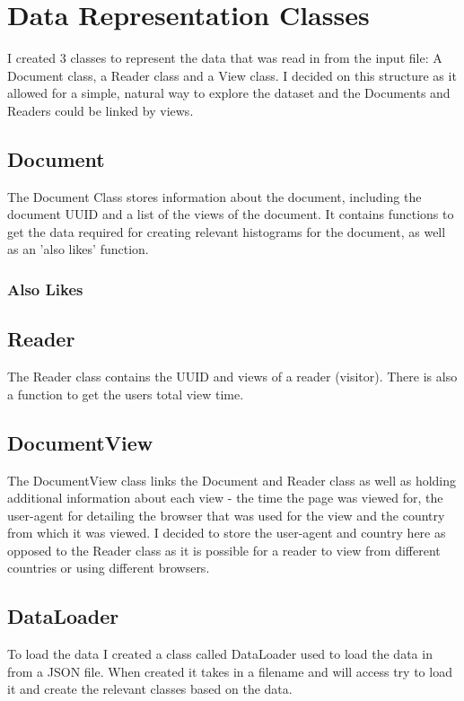 \documentclass[11pt]{report}
\begin{document}
\section{Data Representation Classes}
I created 3 classes to represent the data that was read in from the input file: A Document class, a Reader class and a View class.  I decided on this structure as it allowed for a simple, natural way to explore the dataset and the Documents and Readers could be linked by views.

\subsection{Document}
The Document Class stores information about the document, including the document UUID and a list of the views of the document.  It contains functions to get the data required for creating relevant histograms for the document, as well as an 'also likes' function.

\subsubsection{Also Likes}

\subsection{Reader}
The Reader class contains the UUID and views of a reader (visitor).  There is also a function to get the users total view time.

\subsection{DocumentView}
The DocumentView class links the Document and Reader class as well as holding additional information about each view - the time the page was viewed for, the user-agent for detailing the browser that was used for the view and the country from which it was viewed.  I decided to store the user-agent and country here as opposed to the Reader class as it is possible for a reader to view from different countries or using different browsers.

\subsection{DataLoader}
To load the data I created a class called DataLoader used to load the data in from a JSON file.  When created it takes in a filename and will access try to load it and create the relevant classes based on the data.  
\end{document}
